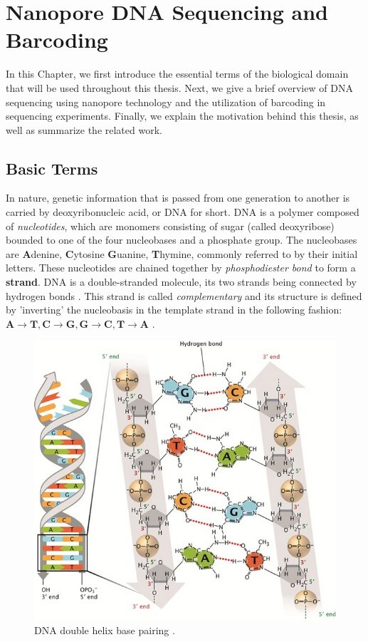 \chapter{Nanopore DNA Sequencing and Barcoding}
\label{kap:sequencing}

In this Chapter, we  first introduce the essential terms of the biological domain that will be used throughout this thesis. Next, we give a brief overview of DNA sequencing using nanopore technology and the utilization of barcoding in sequencing experiments. Finally, we explain the motivation behind this thesis, as well as summarize the related work.

\section{Basic Terms}
In nature, genetic information that is passed from one generation to another is carried by deoxyribonucleic acid, or DNA for short. DNA is a polymer composed of \textit{nucleotides}, which are monomers consisting of sugar (called deoxyribose) bounded to one of the four nucleobases and a phosphate group. The nucleobases are \textbf{A}denine, \textbf{C}ytosine \textbf{G}uanine, \textbf{T}hymine, commonly referred to by their initial letters. These nucleotides are chained together by \textit{phosphodiester bond} to form a \textbf{strand}. DNA is a double-stranded molecule, its two strands being connected by hydrogen bonds \cite{pray2008discovery}. This strand is called \textit{complementary} and its structure is defined by 'inverting' the nucleobasis in the template strand in the following fashion: $\textbf{A} \to \textbf{T}, \textbf{C} \to \textbf{G}, \textbf{G} \to \textbf{C}, \textbf{T} \to \textbf{A}$ \cite{pray2008discovery}.

\begin{figure}
    \centering
    \includegraphics[width=12cm]{images/double_helix.jpg}
    \caption[DNA double helix]{DNA double helix base pairing \cite{pray2008discovery}.}
    \label{fig:double_helix}
\end{figure}

